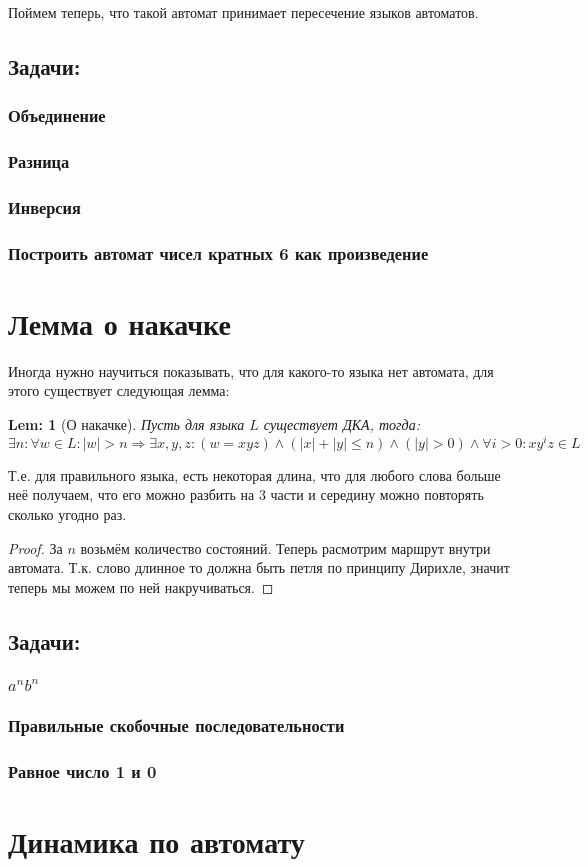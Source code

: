 \documentclass[10pt,a4paper]{article}
\newtheorem{Lem}{Lem:}
\begin{document}
Поймем теперь, что такой автомат принимает пересечение языков автоматов.

\subsection{Задачи:}

\subsubsection{Объединение}

\subsubsection{Разница}

\subsubsection{Инверсия}

\subsubsection{Построить автомат чисел кратных 6 как произведение}

\section{Лемма о накачке}

Иногда нужно научиться показывать, что для какого-то языка нет автомата, для 
этого существует следующая лемма:

\begin{Lem}[О накачке]
    Пусть для языка $L$ существует ДКА, тогда:
     $$\exists n\colon \forall w \in L\colon |w| > n \Rightarrow 
         \exists x, y, z\colon 
             (w = xyz) \wedge 
             (|x| + |y| \leq n) \wedge 
             (|y| > 0) \wedge 
             \forall i > 0\colon xy^iz \in L $$
\end{Lem}

Т.е. для правильного языка, есть некоторая длина, что для любого слова больше неё
получаем, что его можно разбить на 3 части и середину можно повторять сколько угодно раз.

\begin{proof}
За $n$ возьмём количество состояний. Теперь расмотрим маршрут внутри автомата.
Т.к. слово длинное то должна быть петля по принципу Дирихле, значит теперь мы можем по ней накручиваться.
\end{proof}

\subsection{Задачи:}
    \subsubsection{$a^nb^n$}
    \subsubsection{Правильные скобочные последовательности}
    \subsubsection{Равное число 1 и 0}
    
\section{Динамика по автомату}
\end{document}
